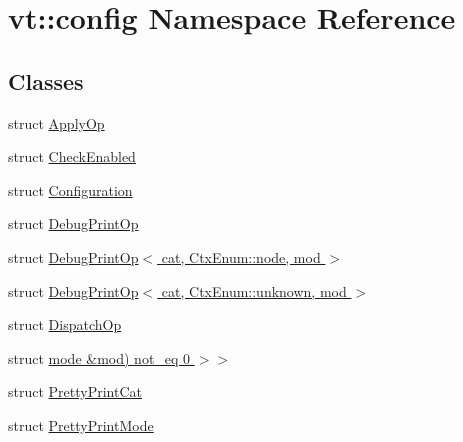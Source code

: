 \hypertarget{namespacevt_1_1config}{}\section{vt\+:\+:config Namespace Reference}
\label{namespacevt_1_1config}
\subsection*{Classes}
\begin{DoxyCompactItemize}
\item 
struct \hyperlink{structvt_1_1config_1_1_apply_op}{Apply\+Op}
\item 
struct \hyperlink{structvt_1_1config_1_1_check_enabled}{Check\+Enabled}
\item 
struct \hyperlink{structvt_1_1config_1_1_configuration}{Configuration}
\item 
struct \hyperlink{structvt_1_1config_1_1_debug_print_op}{Debug\+Print\+Op}
\item 
struct \hyperlink{structvt_1_1config_1_1_debug_print_op_3_01cat_00_01_ctx_enum_1_1node_00_01mod_01_4}{Debug\+Print\+Op$<$ cat, Ctx\+Enum\+::node, mod $>$}
\item 
struct \hyperlink{structvt_1_1config_1_1_debug_print_op_3_01cat_00_01_ctx_enum_1_1unknown_00_01mod_01_4}{Debug\+Print\+Op$<$ cat, Ctx\+Enum\+::unknown, mod $>$}
\item 
struct \hyperlink{structvt_1_1config_1_1_dispatch_op}{Dispatch\+Op}
\item 
struct \hyperlink{structvt_1_1config_1_1_check_enabled_3_01_op_00_01_c_00_01cat_00_01ctx_00_01mod_00_01typename_01b5559c30be7945adbd887e9215f6d30d}{mode \&mod) not\+\_\+eq 0 $>$$>$}
\item 
struct \hyperlink{structvt_1_1config_1_1_pretty_print_cat}{Pretty\+Print\+Cat}
\item 
struct \hyperlink{structvt_1_1config_1_1_pretty_print_mode}{Pretty\+Print\+Mode}
\end{DoxyCompactItemize}
